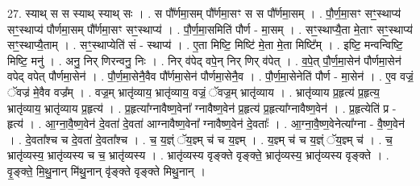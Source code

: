 \documentclass[17pt]{extarticle}
\begin{document}
27. स्याथ् स स स्याथ् स्याथ् सः । . स पौ᳚र्णमा॒सम् पौ᳚र्णमा॒सꣳ स स पौ᳚र्णमा॒सम् । . पौ॒र्ण॒मा॒सꣳ सꣳ॒॒स्थाप्य॑ सꣳ॒॒स्थाप्य॑ पौर्णमा॒सम् पौ᳚र्णमा॒सꣳ सꣳ॒॒स्थाप्य॑ । . पौ॒र्ण॒मा॒समिति॑ पौर्ण - मा॒सम् । . सꣳ॒॒स्थाप्यै॒ता मे॒ताꣳ सꣳ॒॒स्थाप्य॑ सꣳ॒॒स्थाप्यै॒ताम् । . सꣳ॒॒स्थाप्येति॑ सं - स्थाप्य॑ । . ए॒ता मिष्टि॒ मिष्टि॑ मे॒ता मे॒ता मिष्टि᳚म् । . इष्टि॒ मन्वन्विष्टि॒ मिष्टि॒ मनु॑ । . अनु॒ निर् णिरन्वनु॒ निः । . निर् व॑पेद् वपे॒न् निर् णिर् व॑पेत् । . व॒पे॒त् पौ॒र्ण॒मा॒सेन॑ पौर्णमा॒सेन॑ वपेद् वपेत् पौर्णमा॒सेन॑ । . पौ॒र्ण॒मा॒सेनै॒वैव पौ᳚र्णमा॒सेन॑ पौर्णमा॒सेनै॒व । . पौ॒र्ण॒मा॒सेनेति॑ पौर्ण - मा॒सेन॑ । . ए॒व वज्रं॒ ॅवज्र॑ मे॒वैव वज्र᳚म् । . वज्र॒म् भ्रातृ॑व्याय॒ भ्रातृ॑व्याय॒ वज्रं॒ ॅवज्र॒म् भ्रातृ॑व्याय । . भ्रातृ॑व्याय प्र॒हृत्य॑ प्र॒हृत्य॒ भ्रातृ॑व्याय॒ भ्रातृ॑व्याय प्र॒हृत्य॑ । . प्र॒हृत्या᳚ग्नावैष्ण॒वेना᳚ ग्नावैष्ण॒वेन॑ प्र॒हृत्य॑ प्र॒हृत्या᳚ग्नावैष्ण॒वेन॑ । . प्र॒हृत्येति॑ प्र - हृत्य॑ । . आ॒ग्ना॒वै॒ष्ण॒वेन॑ दे॒वता॑ दे॒वता॑ आग्नावैष्ण॒वेना᳚ ग्नावैष्ण॒वेन॑ दे॒वताः᳚ । . आ॒ग्ना॒वै॒ष्ण॒वेनेत्या᳚ग्ना - वै॒ष्ण॒वेन॑ । . दे॒वता᳚श्च च दे॒वता॑ दे॒वता᳚श्च । . च॒ य॒ज्ञ्ं ॅय॒ज्ञ्म् च॑ च य॒ज्ञ्म् । . य॒ज्ञ्म् च॑ च य॒ज्ञ्ं ॅय॒ज्ञ्म् च॑ । . च॒ भ्रातृ॑व्यस्य॒ भ्रातृ॑व्यस्य च च॒ भ्रातृ॑व्यस्य । . भ्रातृ॑व्यस्य वृङ्क्ते वृङ्क्ते॒ भ्रातृ॑व्यस्य॒ भ्रातृ॑व्यस्य वृङ्क्ते । . वृ॒ङ्क्ते॒ मि॒थु॒नान् मि॑थु॒नान् वृ॑ङ्क्ते वृङ्क्ते मिथु॒नान् । \newline
\end{document}
